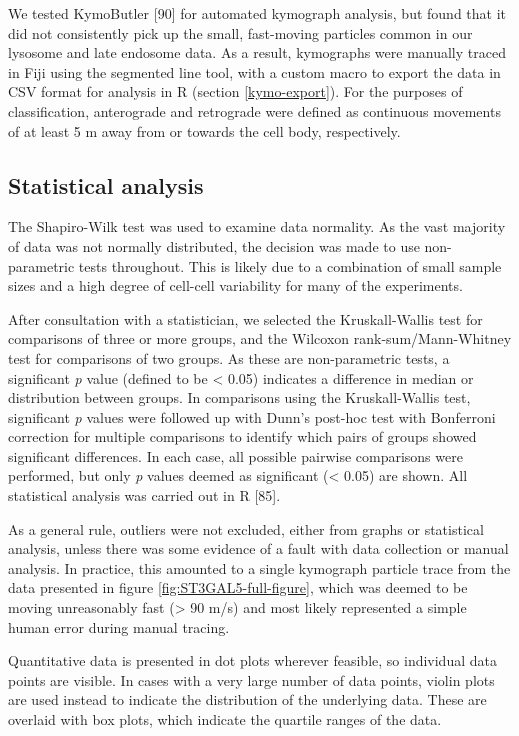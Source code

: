 \documentclass[
  12pt,
  a4paper,
]{book}
\begin{document}
We tested KymoButler {[}90{]} for automated kymograph analysis, but found that it did not consistently pick up the small, fast-moving particles common in our lysosome and late endosome data. As a result, kymographs were manually traced in Fiji using the segmented line tool, with a custom macro to export the data in CSV format for analysis in R (section \ref{kymo-export}). For the purposes of classification, anterograde and retrograde were defined as continuous movements of at
least 5 \textmu{}m away from or towards the cell body, respectively.

\subsection{Statistical analysis}\label{statistical-analysis}

The Shapiro-Wilk test was used to examine data normality. As the vast majority of data was not normally distributed, the decision was made to use non-parametric tests throughout. This is likely due to a combination of small sample sizes and a high degree of cell-cell variability for many of the experiments.

After consultation with a statistician, we selected the Kruskall-Wallis test for comparisons of three or more groups, and the Wilcoxon rank-sum/Mann-Whitney test for comparisons of two groups. As these are non-parametric tests, a significant \emph{p} value (defined to be \textless{} 0.05) indicates a difference in median or distribution between groups. In comparisons using the Kruskall-Wallis test, significant \emph{p} values were followed up with Dunn's post-hoc test with Bonferroni correction for multiple comparisons to identify which pairs of groups showed significant differences. In each case, all possible pairwise comparisons were performed, but only \emph{p} values deemed as significant (\textless{} 0.05) are shown. All statistical analysis was carried out in R {[}85{]}.

As a general rule, outliers were not excluded, either from graphs or statistical analysis, unless there was some evidence of a fault with data collection or manual analysis. In practice, this amounted to a single kymograph particle trace from the data presented in figure \ref{fig:ST3GAL5-full-figure}, which was deemed to be moving unreasonably fast (\textgreater{} 90 \textmu{}m/s) and most likely represented a simple human error during manual tracing.

Quantitative data is presented in dot plots wherever feasible, so individual data points are visible. In cases with a very large number of data points, violin plots are used instead to indicate the distribution of the underlying data. These are overlaid with box plots, which indicate the quartile ranges of the data.
\end{document}

